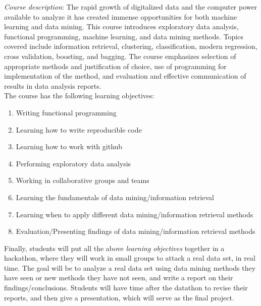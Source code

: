\documentclass[11pt]{article}
\begin{document}
\emph{Course description}: The rapid growth of digitalized data and the computer power available to analyze it has created immense opportunities for both machine learning and data mining. This course introduces exploratory data analysis, functional programming, machine learning, and data mining methods. Topics covered include information retrieval, clustering, classification, modern regression, cross validation, boosting, and bagging. The course emphasizes selection of appropriate methods and justification of choice, use of programming for implementation of the method, and evaluation and effective communication of results in data analysis reports. \\

The course has the following learning objectives:

\begin{enumerate}
\item Writing functional programming
\item Learning how to write reproducible code
\item Learning how to work with github 
\item Performing exploratory data analysis 
\item Working in collaborative groups and teams
\item Learning the fundamentals of data mining/information retrieval 
\item Learning when to apply different data mining/information retrieval  methods
\item Evaluation/Presenting findings of data mining/information retrieval  methods
\end{enumerate}

Finally, students will put all the above \emph{learning objectives} together in a hackathon, where they will work in small groups to attack a real data set, in real time. The goal will be to analyze a real data set using data mining methods they have seen or new methods they have not seen, and write a report on their findings/conclusions. Students will have time after the datathon to revise their reports, and then give a presentation, which will serve as the final project.\\
\end{document}

